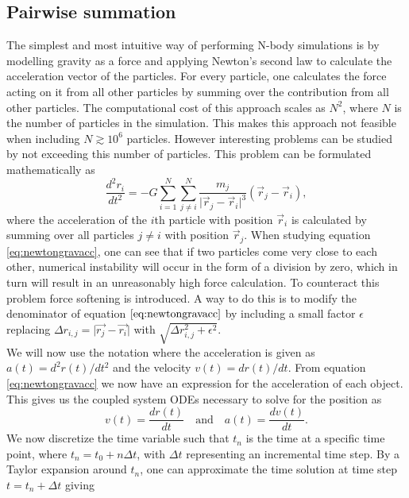 \subsection{Pairwise summation}
The simplest and most intuitive way of performing N-body simulations is by
modelling gravity as a force and applying Newton's second law to calculate the
acceleration vector of the particles. For every particle, one calculates the
force acting on it from all other particles by summing over the contribution
from all other particles. The computational cost of this approach scales as
$N^2$, where $N$ is the number of particles in the simulation. This makes this
approach not feasible when including $N\gtrsim10^6$ particles. However
interesting problems can be studied by not exceeding this number of particles. This problem can be formulated mathematically as
\begin{equation}\label{eq:newtongravacc}
    \frac{d^2r_i}{dt^2}=-G\sum_{i=1}^{N}\sum_{j\neq i}^N\frac{m_j}{\vert\vec{r}_j-\vec{r}_i\vert^3}(\vec{r}_j-\vec{r}_i),
\end{equation}
where the acceleration of the $i$th particle with position
$\vec{r}_i$ is calculated by summing over all particles $j\neq i$ with position $\vec{r}_j$.
When studying equation \ref{eq:newtongravacc}, one can see that if two particles
come very close to each other, numerical instability will occur in the form of a division by
zero, which in turn will result in an unreasonably high force calculation. To counteract this problem
force softening is introduced. A way to do this is to modify the denominator of
equation $\ref{eq:newtongravacc}$ by including a small factor $\epsilon$
replacing $\Delta r_{i,j}=\vert\vec{r_j}-\vec{r_i}\vert$ with $\sqrt{\Delta
r_{i,j}^2+\epsilon^2}$\cite[ch.2]{Fazio2309855}. \\\indent
We will now use the notation where the acceleration is
given as $a(t)=d^2r(t)/dt^2$ and the velocity $v(t)=dr(t)/dt$.
From equation \ref{eq:newtongravacc} we now have an expression for the acceleration of each object.
This gives us the coupled system ODEs necessary to solve for the position as
\begin{equation}
    v(t)=\frac{dr(t)}{dt} \quad\mathrm{and}\quad a(t)=\frac{dv(t)}{dt}.
\end{equation}
We now discretize the time variable such that $t_n$ is the time at a specific
time point, where $t_n=t_0+n\Delta t$, with $\Delta t$ representing an incremental
time step. By a Taylor expansion around $t_n$, one can approximate the time
solution at time step $t=t_n+\Delta t$ giving
